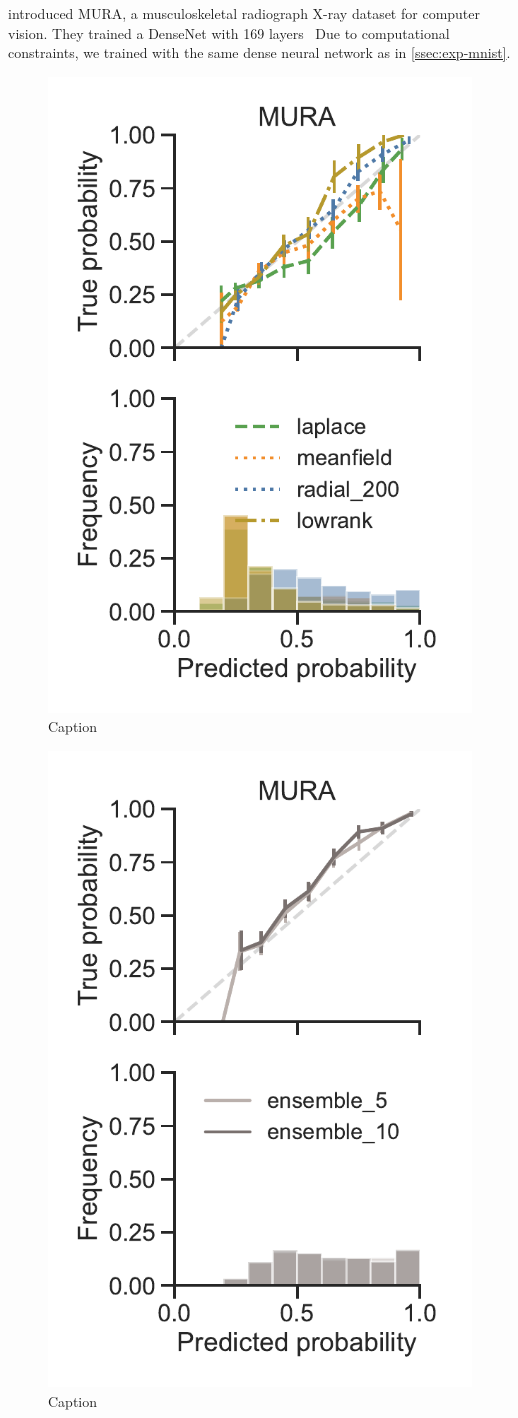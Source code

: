\documentclass[10pt,a4paper,twocolumn]{article}
\begin{document}
\textcite{rajpurkar2017mura} introduced MURA, a musculoskeletal radiograph X-ray dataset for computer vision.
They trained a DenseNet with 169 layers~\cite{huang2017densely}
Due to computational constraints, we trained with the same dense neural network as in \cref{ssec:exp-mnist}.

%
\begin{figure}
    \centering
    \includegraphics[width=0.55\linewidth]{figures/MuraVI.pdf}
    \caption{Caption}
    \label{fig:mura-cc-vi}
\end{figure}
\begin{figure}
    \centering
    \includegraphics[width=0.55\linewidth]{figures/MuraEnsembles.pdf}
    \caption{Caption}
    \label{fig:mura-cc-ensembles}
\end{figure}
\end{document}
